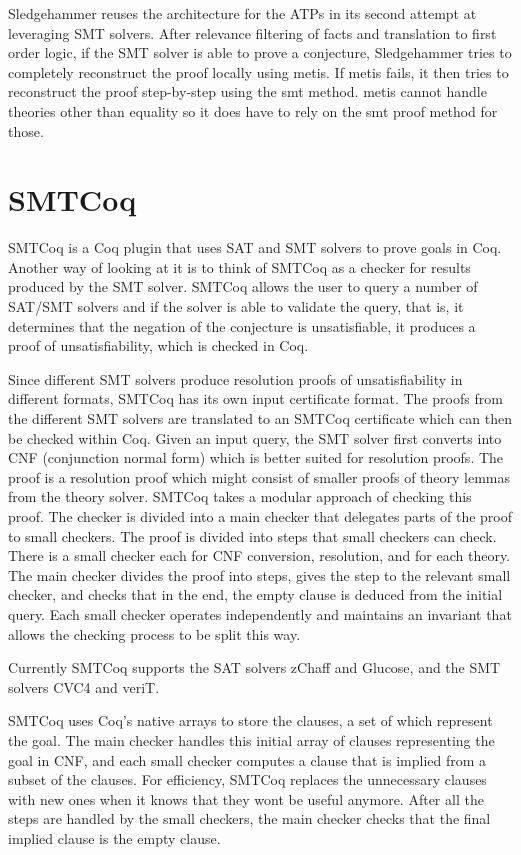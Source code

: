\documentclass{article}
\begin{document}
	Sledgehammer reuses the architecture for the ATPs 
	in its second attempt at leveraging SMT solvers. 
	After relevance filtering of facts and translation to 
	first order logic, if the SMT solver is able to
	prove a conjecture, Sledgehammer tries to completely
	reconstruct the proof locally using metis. If metis fails,
	it then tries to reconstruct the proof step-by-step using 
	the smt method. metis cannot handle theories other 
	than equality so it does have to rely on the smt proof
	method for those.
	
\section{SMTCoq}
\label{sec:cert}
	SMTCoq is a Coq plugin that uses SAT and SMT solvers to 
	prove goals in Coq. Another way of looking at it is 
	to think of SMTCoq as a checker for results produced 
	by the SMT solver. SMTCoq allows the user to query 
	a number of SAT/SMT solvers and if the solver is able 
	to validate the query, that is, it determines that 
	the negation of the conjecture is unsatisfiable, it 
	produces a proof of unsatisfiability, which is checked 
	in Coq.
	
	Since different SMT solvers produce resolution 
	proofs of unsatisfiability in different formats, 
	SMTCoq has its own input certificate format. 
	The proofs from the different SMT solvers are 
	translated to an SMTCoq certificate which 
	can then be checked within Coq. Given an input 
	query, the SMT solver first converts into CNF
	(conjunction normal form) which is better 
	suited for resolution proofs. The proof is a 
	resolution proof which might consist of smaller proofs 
	of theory lemmas from the theory solver. 
	SMTCoq takes a modular approach of checking this proof.
	The checker is divided into a main checker that 
	delegates parts of the proof to small checkers. The proof 
	is divided into steps that small checkers can check.
	There is a small checker each for CNF conversion, 
	resolution, and for each theory. The main checker divides the 
	proof into steps, gives the step to the relevant small 
	checker, and checks that in the end, the empty 
	clause is deduced from the initial query. Each small 
	checker operates independently and maintains an invariant
	that allows the checking process to be split this way.
	
	Currently SMTCoq supports the SAT solvers zChaff and Glucose, 
	and the SMT solvers CVC4 and veriT. 
	
	SMTCoq uses Coq's native arrays to store the clauses, 
	a set of which represent the goal. The main checker 
	handles this initial array of clauses representing the 
	goal in CNF, and each small checker computes a 
	clause that is implied from a subset of the clauses.
	For efficiency, SMTCoq replaces the unnecessary 
	clauses with new ones when it knows that they 
	wont be useful anymore. After all the steps 
	are handled by the small checkers, the main 
	checker checks that the final implied clause is 
	the empty clause.
	
\end{document}
